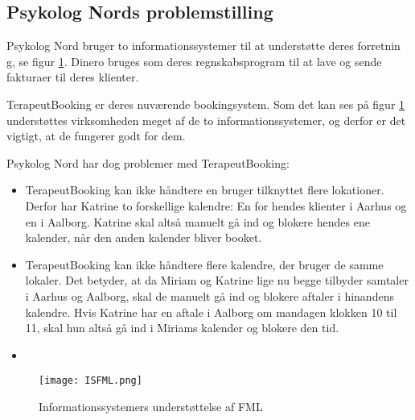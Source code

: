\subsection{Psykolog Nords problemstilling}

Psykolog Nord bruger to informationssystemer til at understøtte deres forretnin
g, se figur \ref{forretning:isfml}.
Dinero bruges som deres regnskabsprogram til at lave og sende fakturaer til deres klienter.

TerapeutBooking er deres nuværende bookingsystem.
Som det kan ses på figur \ref{forretning:isfml} understøttes virksomheden meget af de to informationssystemer, og derfor er det vigtigt, at de fungerer godt for dem.

Psykolog Nord har dog problemer med TerapeutBooking:

\begin{itemize}
    \item TerapeutBooking kan ikke håndtere en bruger tilknyttet flere lokationer.
    Derfor har Katrine to forskellige kalendre: En for hendes klienter i Aarhus og en i Aalborg.
    Katrine skal altså manuelt gå ind og blokere hendes ene kalender, når den anden kalender bliver booket.
    
    \item TerapeutBooking kan ikke håndtere flere kalendre, der bruger de samme lokaler.
    Det betyder, at da Miriam og Katrine lige nu begge tilbyder samtaler i Aarhus og Aalborg, skal de manuelt gå ind og blokere aftaler i hinandens kalendre.
    Hvis Katrine har en aftale i Aalborg om mandagen klokken 10 til 11, skal hun altså gå ind i Miriams kalender og blokere den tid.
    
   \item 
\end{itemize}

\begin{figure}
    \caption{Informationssystemers understøttelse af FML}
    \centering
        \texttt{[image: ISFML.png]}
    \label{forretning:isfml}
\end{figure}
